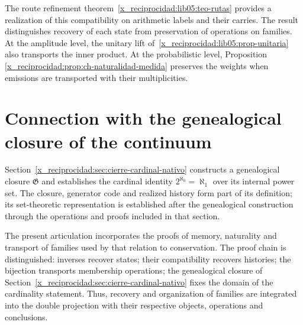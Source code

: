 The route refinement theorem~\ref{x_reciprocidad:lib05:teo-rutas}
provides a realization of this compatibility on arithmetic
labels and their carries. The result distinguishes recovery
of each state from preservation of operations on families.
At the amplitude level, the unitary lift
of~\ref{x_reciprocidad:lib05:prop-unitaria} also transports the inner product.
At the probabilistic level, Proposition
\ref{x_reciprocidad:prop:ch-naturalidad-medida} preserves the weights when
emissions are transported with their multiplicities.

\section{Connection with the genealogical closure of the continuum}
Section~\ref{x_reciprocidad:sec:cierre-cardinal-nativo} constructs a genealogical
closure \(\mathfrak G\) and establishes the cardinal identity
\(2^{\aleph_0}=\aleph_1\) over its internal power set. The closure,
generator code and realized history form part of its
definition; its set-theoretic representation is established after the
genealogical construction through the operations and proofs
included in that section.

The present articulation incorporates the proofs of memory,
naturality and transport of families used by that relation to
conservation. The proof chain is distinguished:
inverses recover states; their compatibility recovers
histories; the bijection transports membership operations;
the genealogical closure of Section~\ref{x_reciprocidad:sec:cierre-cardinal-nativo} fixes the domain
of the cardinality statement. Thus, recovery and organization
of families are integrated into the double projection with their respective
objects, operations and conclusions.
